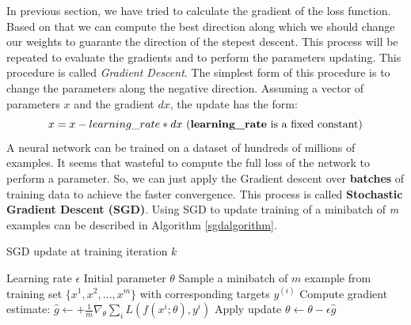 In previous section, we have tried to calculate the gradient of the loss function. Based on that we can compute the best direction along which we should change our weights to guarante the direction of the stepest descent. This process will be repeated to evaluate the gradients and to perform the parameters updating. This procedure is called \textit{Gradient Descent}. The simplest form of this procedure is to change the parameters along the negative direction. Assuming a vector of parameters \textbf{$x$} and the gradient \textbf{$dx$}, the update has the form: 
\begin{equation}
	x = x - learning\_rate \ast dx \text{ (\textbf{learning\_rate} is a fixed constant)}
\end{equation}
A neural network can be trained on a dataset of hundreds of millions of examples. It seems that wasteful to compute the full loss of the network to perform a parameter. So, we can just apply the Gradient descent over \textbf{batches} of training data to achieve the faster convergence. This process is called \textbf{Stochastic Gradient Descent (SGD)}. Using SGD to update training of a minibatch of \textit{m} examples can be described in  Algorithm \ref{sgdalgorithm}.
\begin{algorithm}
	\caption{SGD update at training iteration $k$}
	\label{sgdalgorithm}
	\begin{algorithmic}
		\REQUIRE Learning rate $\epsilon$
		\REQUIRE Initial parameter $\theta$
			\STATE Sample a minibatch of $m$ example from training set $\{ x^1,x^2,\ldots, x^m \}$ with corresponding targets $y^{(i)}$
			\STATE Compute gradient estimate: $\hat{g} \leftarrow + \frac{1}{m} \nabla_\theta \sum_i L(f(x^i;\theta), y^i) $
			\STATE Apply update $\theta \leftarrow \theta - \epsilon \hat{g}$
		\ENDWHILE
	\end{algorithmic}
\end{algorithm}


